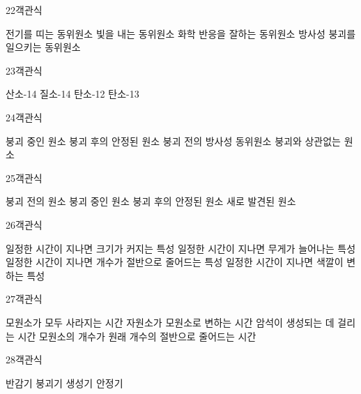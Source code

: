 \documentclass[fs9,seriesRus]{korfarm-base}
\begin{document}
\begin{kfQBlock}{22}{객관식}
\begin{kfChoices}
\kfChoice 전기를 띠는 동위원소
\kfChoice 빛을 내는 동위원소
\kfChoice 화학 반응을 잘하는 동위원소
\kfChoice 방사성 붕괴를 일으키는 동위원소
\end{kfChoices}
\end{kfQBlock}
\begin{kfQBlock}{23}{객관식}
\begin{kfChoices}
\kfChoice 산소-14
\kfChoice 질소-14
\kfChoice 탄소-12
\kfChoice 탄소-13
\end{kfChoices}
\end{kfQBlock}
\begin{kfQBlock}{24}{객관식}
\begin{kfChoices}
\kfChoice 붕괴 중인 원소
\kfChoice 붕괴 후의 안정된 원소
\kfChoice 붕괴 전의 방사성 동위원소
\kfChoice 붕괴와 상관없는 원소
\end{kfChoices}
\end{kfQBlock}
\begin{kfQBlock}{25}{객관식}
\begin{kfChoices}
\kfChoice 붕괴 전의 원소
\kfChoice 붕괴 중인 원소
\kfChoice 붕괴 후의 안정된 원소
\kfChoice 새로 발견된 원소
\end{kfChoices}
\end{kfQBlock}
\begin{kfQBlock}{26}{객관식}
\begin{kfChoices}
\kfChoice 일정한 시간이 지나면 크기가 커지는 특성
\kfChoice 일정한 시간이 지나면 무게가 늘어나는 특성
\kfChoice 일정한 시간이 지나면 개수가 절반으로 줄어드는 특성
\kfChoice 일정한 시간이 지나면 색깔이 변하는 특성
\end{kfChoices}
\end{kfQBlock}
\begin{kfQBlock}{27}{객관식}
\begin{kfChoices}
\kfChoice 모원소가 모두 사라지는 시간
\kfChoice 자원소가 모원소로 변하는 시간
\kfChoice 암석이 생성되는 데 걸리는 시간
\kfChoice 모원소의 개수가 원래 개수의 절반으로 줄어드는 시간
\end{kfChoices}
\end{kfQBlock}
\begin{kfQBlock}{28}{객관식}
\begin{kfChoices}
\kfChoice 반감기
\kfChoice 붕괴기
\kfChoice 생성기
\kfChoice 안정기
\end{kfChoices}
\end{kfQBlock}
\end{document}
